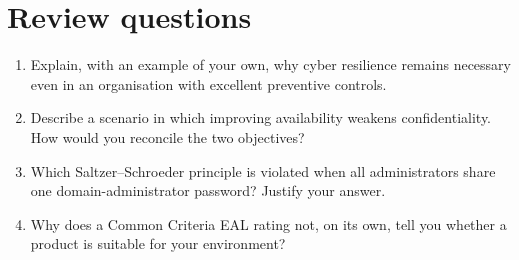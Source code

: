 \section*{Review questions}
\begin{enumerate}
  \item Explain, with an example of your own, why cyber resilience remains necessary even in an organisation with excellent preventive controls.
  \item Describe a scenario in which improving availability weakens confidentiality. How would you reconcile the two objectives?
  \item Which Saltzer–Schroeder principle is violated when all administrators share one domain-administrator password? Justify your answer.
  \item Why does a Common Criteria EAL rating not, on its own, tell you whether a product is suitable for your environment?
\end{enumerate}

